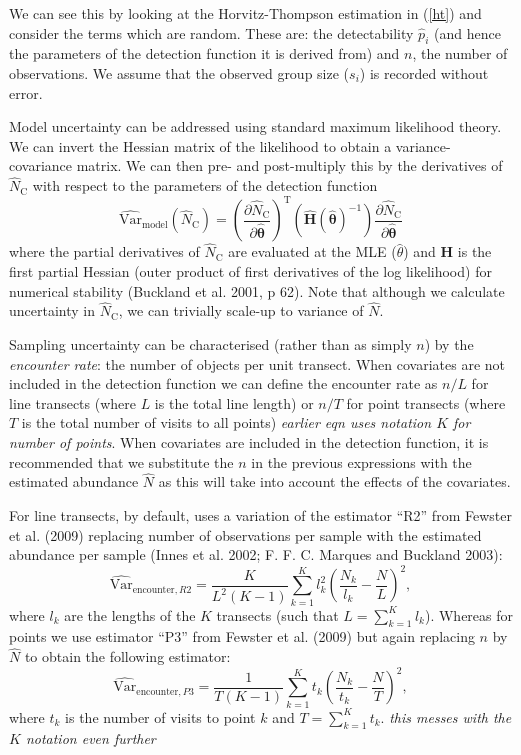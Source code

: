 \documentclass[article]{jss}
\begin{document}
We can see this by looking at the Horvitz-Thompson estimation in
(\ref{ht}) and consider the terms which are random. These are: the
detectability \(\hat{p}_i\) (and hence the parameters of the detection
function it is derived from) and \(n\), the number of observations. We
assume that the observed group size (\(s_i\)) is recorded without error.

Model uncertainty can be addressed using standard maximum likelihood
theory. We can invert the Hessian matrix of the likelihood to obtain a
variance-covariance matrix. We can then pre- and post-multiply this by
the derivatives of \(\hat{N}_\text{C}\) with respect to the parameters
of the detection function \[
\widehat{\text{Var}}_\text{model}\left( \hat{N}_\text{C}\right) = \left(\frac{\partial \hat{N}_\text{C}}{\partial\hat{\boldsymbol{\theta}}}\right)^\text{T} \left(\hat{\mathbf{H}}(\hat{\boldsymbol{\theta}})^{-1} \right)\frac{\partial \hat{N}_\text{C}}{\partial\hat{\boldsymbol{\theta}}}
\] where the partial derivatives of \(\hat{N}_\text{C}\) are evaluated
at the MLE (\(\hat{\theta}\)) and \(\mathbf{H}\) is the first partial
Hessian (outer product of first derivatives of the log likelihood) for
numerical stability (Buckland et al. 2001, p 62). Note that although we
calculate uncertainty in \(\hat{N}_\text{C}\), we can trivially scale-up
to variance of \(\hat{N}\).

Sampling uncertainty can be characterised (rather than as simply \(n\))
by the \emph{encounter rate}: the number of objects per unit transect.
When covariates are not included in the detection function we can define
the encounter rate as \(n/L\) for line transects (where \(L\) is the
total line length) or \(n/T\) for point transects (where \(T\) is the
total number of visits to all points) \emph{earlier eqn uses notation
\(K\) for number of points}. When covariates are included in the
detection function, it is recommended that we substitute the \(n\) in
the previous expressions with the estimated abundance \(\hat{N}\) as
this will take into account the effects of the covariates.

For line transects, by default,  uses a variation of the
estimator ``R2'' from Fewster et al. (2009) replacing number of
observations per sample with the estimated abundance per sample (Innes
et al. 2002; F. F. C. Marques and Buckland 2003): \[
\widehat{\text{Var}}_{\text{encounter},R2} = \frac{K}{L^2(K-1)} \sum_{k=1}^{K} l_k^2 \left( \frac{N_k}{l_k} - \frac{N}{L}\right)^2,
\] where \(l_k\) are the lengths of the \(K\) transects (such that
\(L = \sum_{k=1}^K l_k\)). Whereas for points we use estimator ``P3''
from Fewster et al. (2009) but again replacing \(n\) by \(\hat{N}\) to
obtain the following estimator: \[
\widehat{\text{Var}}_{\text{encounter},P3} = \frac{1}{T(K-1)} \sum_{k=1}^{K} t_k \left( \frac{N_k}{t_k} - \frac{N}{T}\right)^2,
\] where \(t_k\) is the number of visits to point \(k\) and
\(T = \sum_{k=1}^K t_k\). \emph{this messes with the \(K\) notation even
further}
\end{document}
